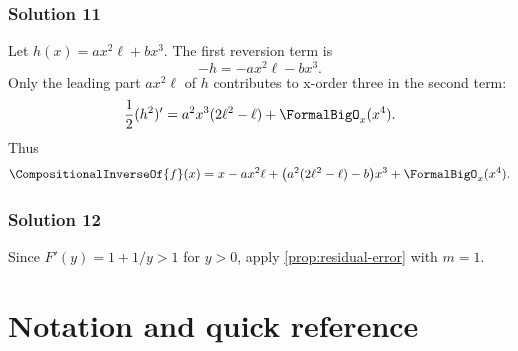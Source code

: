 \documentclass[11pt,openany]{book}
\theoremstyle{definition}
\theoremstyle{plain}
\theoremstyle{remark}
\newcommand{\rev}[1]{\CompositionalInverseOf{#1}}
\begin{document}
\subsection*{Solution 11}
Let \(h(x)=a x^2\ell+b x^3\).  The first reversion term is
\[
 -h=-a x^2\ell-bx^3.
\]
Only the leading part \(a x^2\ell\) of \(h\) contributes to x-order three in
the second term:
\[
 \frac12(h^2)'=a^2x^3(2\ell^2-\ell)+\FormalBigO_x(x^4).
\]
Thus
\[
 \rev f(x)=x-a x^2\ell+
 \bigl(a^2(2\ell^2-\ell)-b\bigr)x^3
 +\FormalBigO_x(x^4).
\]

\subsection*{Solution 12}
Since \(F'(y)=1+1/y>1\) for \(y>0\), apply
\cref{prop:residual-error} with \(m=1\).

\chapter{Notation and quick reference}\label{app:notation}
\end{document}
